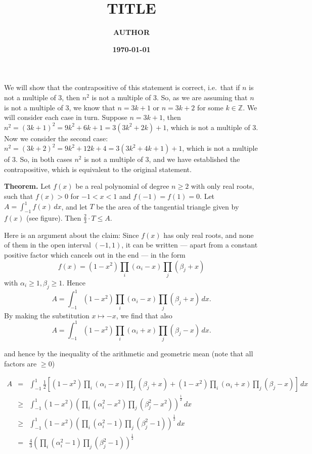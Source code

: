 \documentclass[12pt]{article}
\title{\textbf{TITLE}}
\author{\textbf{AUTHOR}}
\date{\textbf{\shortdate\today}}
\theoremstyle{definition}
\begin{document}
% 



We will show that the contrapositive of this statement is correct, i.e.~that if $n$ is not a multiple of 3, then $n^2$ is not a multiple of 3. So, as we are assuming that $n$ is not a multiple of 3, we know that $n=3k+1$ or $n=3k+2$ for some $k\in\mathbb{Z}$. We will consider each case in turn. Suppose $n=3k+1$, then $n^2=(3k+1)^2=9k^2+6k+1=3(3k^2+2k)+1$, which is not a multiple of 3. Now we consider the second case: $n^2=(3k+2)^2=9k^2+12k+4=3(3k^2+4k+1)+1$, which is not a multiple of 3. So, in both cases $n^2$ is not a multiple of 3, and we have established the contrapositive, which is equivalent to the original statement.



\newpage

\textbf{Theorem.} Let $f(x)$ be a real polynomial of degree $n\ge2$ with only real roots, such that $f(x)>0$ for $-1<x<1$ and $f(-1)=f(1)=0$. Let $A=\int_{-1}^1 f(x)\, dx$, and let $T$ be the area of the tangential triangle given by $f(x)$ (see figure). Then $\frac{2}{3}\cdot T\le A$.

\vspace{1cm}
Here is an argument about the claim:
\newpage
Since $f(x)$ has only real roots, and none of them in the open interval $(-1,1)$, it can be written --- apart from a constant positive factor which cancels out in the end --- in the form
\begin{equation}
f(x)=(1-x^2)\prod_i(\alpha_i-x)\prod_j(\beta_j+x)
\end{equation}
with $\alpha_i\ge1,\beta_j\ge1$. Hence
$$
A=\int_{-1}^{1}(1-x^2)\prod_i(\alpha_i-x)\prod_j(\beta_j+x)\,dx.
$$
By making the substitution $x\longmapsto -x$, we find that also
$$
A=\int_{-1}^{1}(1-x^2)\prod_i(\alpha_i+x)\prod_j(\beta_j-x)\,dx.
$$

and hence by the inequality of the arithmetic and geometric mean (note that all factors are $\ge0$)

\begin{eqnarray*}%
A  & = &  \int_{-1}^{1} \frac{1}{2} [(1-x^2)\prod_i(\alpha_i-x)\prod_j(\beta_j+x) +(1-x^2)\prod_i(\alpha_i+x)\prod_j(\beta_j-x) ]\, dx\\
 & \ge & \int_{-1}^1 (1-x^2)\left(\prod_i(\alpha_i^2-x^2)\prod_j(\beta_j^2-x^2)\right)^\frac{1}{2}\, dx\\
 & \ge & \int_{-1}^1(1-x^2)\left(\prod_i(\alpha_i^2-1)\prod_j(\beta_j^2-1)\right)^\frac{1}{2}\, dx\\
 & = & \frac{4}{3}\left(\prod_i(\alpha_i^2-1)\prod_j(\beta_j^2-1)\right)^\frac{1}{2}
\end{eqnarray*}
\end{document}
